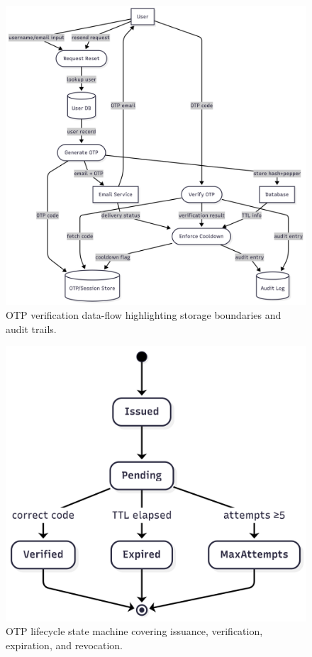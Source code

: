 \documentclass[conference]{IEEEtran}
\begin{document}
\begin{figure}[t]
  \centering
  \includegraphics[width=0.9\linewidth]{detailed_data_flow.png}
  \caption{OTP verification data-flow highlighting storage boundaries and audit trails.}
  \label{fig:dfd}
\end{figure}

\begin{figure}[t]
  \centering
  \includegraphics[width=0.85\linewidth]{otp_lifecycle_state_machine.png}
  \caption{OTP lifecycle state machine covering issuance, verification, expiration, and revocation.}
  \label{fig:otp_state}
\end{figure}
\end{document}
